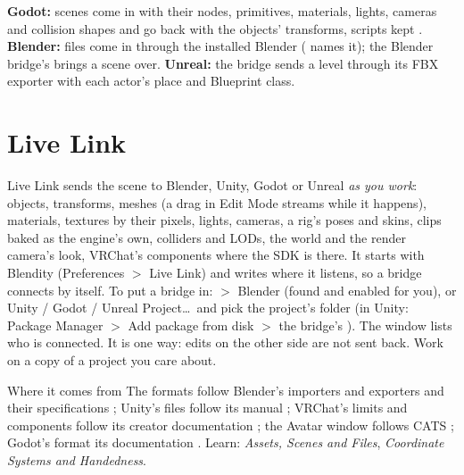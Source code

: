\textbf{Godot:}  scenes come in with their nodes, primitives, materials, lights, cameras and collision
shapes and go back with the objects' transforms, scripts kept \cite{GodotDocs2026}. \textbf{Blender:} 
files come in through the installed Blender ( names it); the Blender bridge's 
brings a scene over. \textbf{Unreal:} the bridge sends a level through its FBX exporter with each actor's place and
Blueprint class.

\section{Live Link}
Live Link sends the scene to Blender, Unity, Godot or Unreal \emph{as you work}: objects, transforms, meshes (a drag in
Edit Mode streams while it happens), materials, textures by their pixels, lights, cameras, a rig's poses and skins,
clips baked as the engine's own, colliders and LODs, the world and the render camera's look, VRChat's components where
the SDK is there. It starts with Blendity (Preferences $>$ Live Link) and writes where it listens, so a bridge connects
by itself. To put a bridge in:  $>$ Blender (found and enabled for you), or
Unity / Godot / Unreal Project\ldots\ and pick the project's folder (in Unity: Package Manager $>$ Add package from
disk $>$ the bridge's ). The window lists who is connected. It is one way: edits on the other side
are not sent back. Work on a copy of a project you care about.

\begin{fromnote}{Where it comes from}
The formats follow Blender's importers and exporters \cite{Blender2026} and their specifications
\cite{Khronos2021Gltf, FBXBlender2026, USD2026}; Unity's files follow its manual \cite{UnityManual2026,
UnityPrefabsandtheYAMLsceneformat, UnityExportingapackage}; VRChat's limits and components follow its creator
documentation \cite{VRChatCreators2026}; the Avatar window follows CATS \cite{CATS2026}; Godot's format its
documentation \cite{GodotDocs2026}. Learn: \emph{Assets, Scenes and Files}, \emph{Coordinate Systems and Handedness}.
\end{fromnote}
